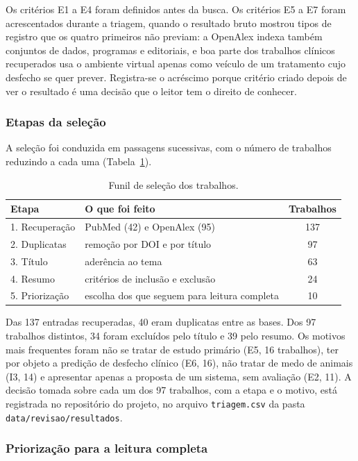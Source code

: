 Os critérios E1 a E4 foram definidos antes da busca. Os critérios E5 a E7
foram acrescentados durante a triagem, quando o resultado bruto mostrou
tipos de registro que os quatro primeiros não previam: a OpenAlex indexa
também conjuntos de dados, programas e editoriais, e boa parte dos
trabalhos clínicos recuperados usa o ambiente virtual apenas como veículo
de um tratamento cujo desfecho se quer prever. Registra-se o acréscimo
porque critério criado depois de ver o resultado é uma decisão que o
leitor tem o direito de conhecer.

\subsubsection{Etapas da seleção}

A seleção foi conduzida em passagens sucessivas, com o número de
trabalhos reduzindo a cada uma (Tabela~\ref{tab:funil}).

\begin{table}[htbp]
\centering
\caption{Funil de seleção dos trabalhos.}
\label{tab:funil}
\begin{tabular}{p{3.6cm}p{6.6cm}c}
\toprule
\textbf{Etapa} & \textbf{O que foi feito} & \textbf{Trabalhos} \\
\midrule
1. Recuperação & PubMed (42) e OpenAlex (95) & 137 \\
2. Duplicatas & remoção por DOI e por título & 97 \\
3. Título & aderência ao tema & 63 \\
4. Resumo & critérios de inclusão e exclusão & 24 \\
5. Priorização & escolha dos que seguem para leitura completa & 10 \\
\bottomrule
\end{tabular}
\end{table}

Das 137 entradas recuperadas, 40 eram duplicatas entre as bases. Dos 97
trabalhos distintos, 34 foram excluídos pelo título e 39 pelo resumo. Os
motivos mais frequentes foram não se tratar de estudo primário (E5, 16
trabalhos), ter por objeto a predição de desfecho clínico (E6, 16),
não tratar de medo de animais (I3, 14) e apresentar apenas a proposta de um
sistema, sem avaliação (E2, 11). A decisão tomada sobre cada um dos 97
trabalhos, com a etapa e o motivo, está registrada no repositório do
projeto, no arquivo \texttt{triagem.csv} da pasta
\texttt{data/revisao/resultados}.

\subsubsection{Priorização para a leitura completa}


